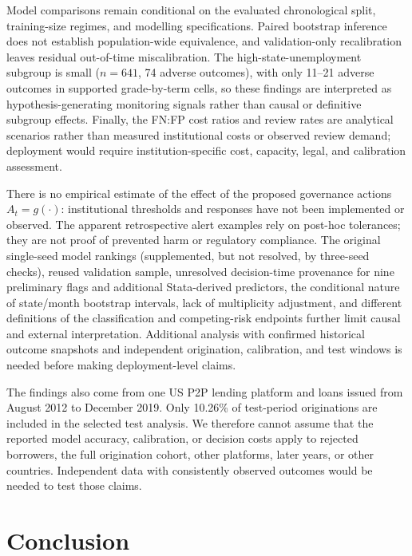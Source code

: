 \documentclass[10pt]{article}
\begin{document}
Model comparisons remain conditional on the evaluated chronological split, training-size regimes, and modelling specifications. Paired bootstrap inference does not establish population-wide equivalence, and validation-only recalibration leaves residual out-of-time miscalibration. The high-state-unemployment subgroup is small ($n=641$, 74 adverse outcomes), with only 11--21 adverse outcomes in supported grade-by-term cells, so these findings are interpreted as hypothesis-generating monitoring signals rather than causal or definitive subgroup effects. Finally, the FN:FP cost ratios and review rates are analytical scenarios rather than measured institutional costs or observed review demand; deployment would require institution-specific cost, capacity, legal, and calibration assessment.

There is no empirical estimate of the effect of the proposed governance actions $A_t=g(\cdot)$: institutional thresholds and responses have not been implemented or observed. The apparent retrospective alert examples rely on post-hoc tolerances; they are not proof of prevented harm or regulatory compliance. The original single-seed model rankings (supplemented, but not resolved, by three-seed checks), reused validation sample, unresolved decision-time provenance for nine preliminary flags and additional Stata-derived predictors, the conditional nature of state/month bootstrap intervals, lack of multiplicity adjustment, and different definitions of the classification and competing-risk endpoints further limit causal and external interpretation. Additional analysis with confirmed historical outcome snapshots and independent origination, calibration, and test windows is needed before making deployment-level claims.

The findings also come from one US P2P lending platform and loans issued from August 2012 to December 2019. Only 10.26\% of test-period originations are included in the selected test analysis. We therefore cannot assume that the reported model accuracy, calibration, or decision costs apply to rejected borrowers, the full origination cohort, other platforms, later years, or other countries. Independent data with consistently observed outcomes would be needed to test those claims.

\section{Conclusion}
\end{document}
